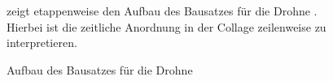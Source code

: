\begin{figure}[ht!]
\vspace{0.25cm}
\begin{center}
\hfill
{}
\hfill
{}
\caption{Aufbau des Bausatzes für die Drohne \Clover}
\label{fig:coexBuild}
\end{center}

\vspace{0.25cm}
 zeigt etappenweise den Aufbau des Bausatzes für die Drohne \Clover. Hierbei ist die zeitliche Anordnung in der Collage zeilenweise zu interpretieren.
\end{figure}


